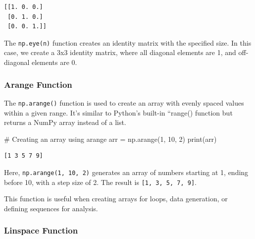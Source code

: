 \documentclass[
  letterpaper,
  DIV=11,
  numbers=noendperiod]{scrreprt}
\newenvironment{Shaded}{\begin{snugshade}}{\end{snugshade}}
\newcommand{\BuiltInTok}[1]{\textcolor[rgb]{0.00,0.23,0.31}{#1}}
\newcommand{\CommentTok}[1]{\textcolor[rgb]{0.37,0.37,0.37}{#1}}
\newcommand{\DecValTok}[1]{\textcolor[rgb]{0.68,0.00,0.00}{#1}}
\newcommand{\NormalTok}[1]{\textcolor[rgb]{0.00,0.23,0.31}{#1}}
\newcommand{\OperatorTok}[1]{\textcolor[rgb]{0.37,0.37,0.37}{#1}}
\theoremstyle{plain}
\theoremstyle{definition}
\theoremstyle{remark}
\begin{document}
\begin{verbatim}
[[1. 0. 0.]
 [0. 1. 0.]
 [0. 0. 1.]]
\end{verbatim}

The \texttt{np.eye(n)} function creates an identity matrix with the
specified size. In this case, we create a 3x3 identity matrix, where all
diagonal elements are 1, and off-diagonal elements are 0.

\subsubsection{Arange Function}\label{arange-function}

The \texttt{np.arange()} function is used to create an array with evenly
spaced values within a given range. It's similar to Python's built-in
``range() function but returns a NumPy array instead of a list.

\begin{Shaded}
\begin{Highlighting}[]
\CommentTok{\# Creating an array using arange}
\NormalTok{arr }\OperatorTok{=}\NormalTok{ np.arange(}\DecValTok{1}\NormalTok{, }\DecValTok{10}\NormalTok{, }\DecValTok{2}\NormalTok{)}
\BuiltInTok{print}\NormalTok{(arr)}
\end{Highlighting}
\end{Shaded}

\begin{verbatim}
[1 3 5 7 9]
\end{verbatim}

Here, \texttt{np.arange(1,\ 10,\ 2)} generates an array of numbers
starting at 1, ending before 10, with a step size of 2. The result is
\texttt{{[}1,\ 3,\ 5,\ 7,\ 9{]}}.

\begin{tcolorbox}[enhanced jigsaw, leftrule=.75mm, bottomtitle=1mm, colback=white, toptitle=1mm, opacitybacktitle=0.6, toprule=.15mm, colbacktitle=quarto-callout-note-color!10!white, arc=.35mm, colframe=quarto-callout-note-color-frame, title=\textcolor{quarto-callout-note-color}{\faInfo}\hspace{0.5em}{Use:}, titlerule=0mm, rightrule=.15mm, left=2mm, bottomrule=.15mm, breakable, coltitle=black, opacityback=0]

This function is useful when creating arrays for loops, data generation,
or defining sequences for analysis.

\end{tcolorbox}

\subsubsection{Linspace Function}\label{linspace-function}
\end{document}
